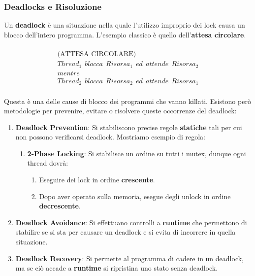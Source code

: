 \documentclass{article}
\begin{document}
\subsubsection{Deadlocks e Risoluzione}

Un \textbf{deadlock} è una situazione nella quale l'utilizzo improprio dei lock causa un blocco dell'intero programma. L'esempio classico è quello dell'\textbf{attesa circolare}. 

\vspace*{-30px}

\begin{multline}
    \\ \text{(ATTESA CIRCOLARE)} \\Thread_{1} \:\: blocca \:\: Risorsa_{1} \:\: ed \:\: attende \:\: Risorsa_{2} \\ mentre \\ Thread_{2} \:\: blocca \:\: Risorsa_{2} \:\: ed \:\: attende \:\: Risorsa_{1} \\
\end{multline}

Questa è una delle cause di blocco dei programmi che vanno killati.
Esistono però metodologie per prevenire, evitare o risolvere queste occorrenze del deadlock:

\begin{enumerate}
    \item \textbf{Deadlock Prevention}: Si stabiliscono precise regole \textbf{statiche} tali per cui non possono verificarsi deadlock. Mostriamo esempio di regola:
    \begin{enumerate}
        \item \textbf{2-Phase Locking}: Si stabilisce un ordine su tutti i mutex, dunque ogni thread dovrà:
        \begin{enumerate}
            \item Eseguire dei lock in ordine \textbf{crescente}.
            \item Dopo aver operato sulla memoria, esegue degli unlock in ordine \textbf{decrescente}.
        \end{enumerate}
    \end{enumerate}
    \item \textbf{Deadlock Avoidance}: Si effettuano controlli a \textbf{runtime} che permettono di stabilire se si sta per causare un deadlock e si evita di incorrere in quella situazione.
    \item \textbf{Deadlock Recovery}: Si permette al programma di cadere in un deadlock, ma se ciò accade a \textbf{runtime} si ripristina uno stato senza deadlock. 
\end{enumerate}
\end{document}
